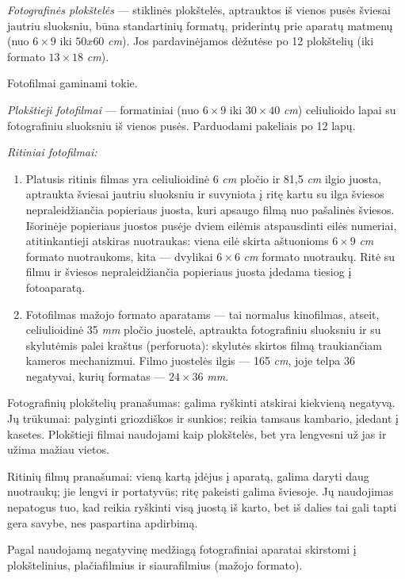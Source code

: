\documentclass{book}
\begin{document}
					\textit{Fotografinės plokštelės} --- stiklinės plokštelės, aptrauktos iš vienos pusės šviesai jautriu sluoksniu, būna standartinių formatų, priderintų prie aparatų matmenų (nuo $6 \times 9$ iki $50 x 60$ \textit{cm}). Jos pardavinėjamos dėžutėse po 12 plokštelių (iki formato $13 \times 18$ \textit{cm}).

					Fotofilmai gaminami tokie.

					\textit{Plokštieji fotofilmai} --- formatiniai (nuo $6 \times 9$ iki $30 \times 40$ \textit{cm}) celiulioido lapai su fotografiniu sluoksniu iš vienos pusės. Parduodami pakeliais po 12 lapų.

					\textit{Ritiniai fotofilmai:}
					\begin{enumerate}
						\item Platusis ritinis filmas yra celiulioidinė 6 \textit{cm} pločio ir 81,5 \textit{cm} ilgio juosta, aptraukta šviesai jautriu sluoksniu ir suvyniota į ritę kartu su ilga šviesos nepraleidžiančia popieriaus juosta, kuri apsaugo filmą nuo pašalinės šviesos. Išorinėje popieriaus juostos pusėje dviem eilėmis atspausdinti eilės numeriai, atitinkantieji atskiras nuotraukas: viena eilė skirta aštuonioms $6 \times 9$ \textit{cm} formato nuotraukoms, kita --- dvylikai $6 \times 6$ \textit{cm} formato nuotraukų. Ritė su filmu ir šviesos nepraleidžiančia popieriaus juosta įdedama tiesiog į fotoaparatą.
						\item Fotofilmas mažojo formato aparatams --- tai normalus kinofilmas, atseit, celiulioidinė 35 \textit{mm} pločio juostelė, aptraukta fotografiniu sluoksniu ir su skylutėmis palei kraštus (perforuota): skylutės skirtos filmą traukiančiam kameros mechanizmui. Filmo juostelės ilgis --- 165 \textit{cm}, joje telpa 36 negatyvai, kurių formatas --- $24 \times 36$ \textit{mm}.
					\end{enumerate}

					Fotografinių plokštelių pranašumas: galima ryškinti atskirai kiekvieną negatyvą. Jų trūkumai: palyginti griozdiškos ir sunkios; reikia tamsaus kambario, įdedant į kasetes. Plokštieji filmai naudojami kaip plokštelės, bet yra lengvesni už jas ir užima mažiau vietos.

					Ritinių filmų pranašumai: vieną kartą įdėjus į aparatą, galima daryti daug nuotraukų; jie lengvi ir portatyvūs; ritę pakeisti galima šviesoje. Jų naudojimas nepatogus tuo, kad reikia ryškinti visą juostą iš karto, bet iš dalies tai gali tapti gera savybe, nes paspartina apdirbimą.

					Pagal naudojamą negatyvinę medžiagą fotografiniai aparatai skirstomi į plokštelinius, plačiafilmius ir siaurafilmius (mažojo formato).
\end{document}

